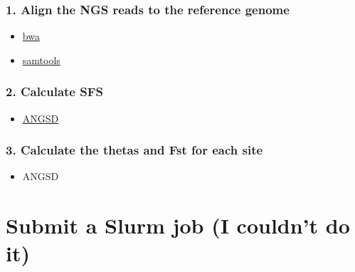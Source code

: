 \documentclass[]{article}
\providecommand{\tightlist}{%
  \setlength{\itemsep}{0pt}\setlength{\parskip}{0pt}}
\begin{document}
\hypertarget{align-the-ngs-reads-to-the-reference-genome}{%
\subsubsection{1. Align the NGS reads to the reference
genome}\label{align-the-ngs-reads-to-the-reference-genome}}

\begin{itemize}
\tightlist
\item
  \href{https://github.com/lh3/bwa}{bwa}
\item
  \href{https://github.com/samtools/samtools}{samtools}
\end{itemize}

\hypertarget{calculate-sfs}{%
\subsubsection{2. Calculate SFS}\label{calculate-sfs}}

\begin{itemize}
\tightlist
\item
  \href{http://www.popgen.dk/angsd/index.php/ANGSD}{ANGSD}
\end{itemize}

\hypertarget{calculate-the-thetas-and-fst-for-each-site}{%
\subsubsection{3. Calculate the thetas and Fst for each
site}\label{calculate-the-thetas-and-fst-for-each-site}}

\begin{itemize}
\tightlist
\item
  ANGSD
\end{itemize}

\hypertarget{submit-a-slurm-job-i-couldnt-do-it}{%
\section{Submit a Slurm job (I couldn't do
it)}\label{submit-a-slurm-job-i-couldnt-do-it}}
\end{document}
